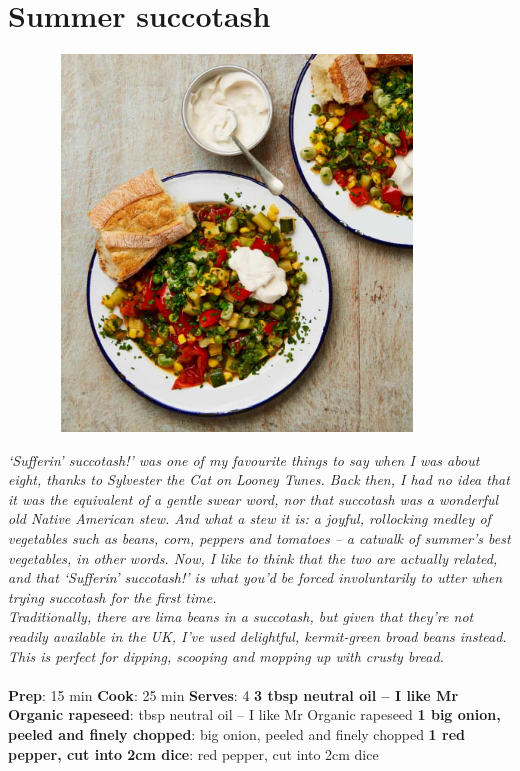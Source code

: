 \documentclass{book}
\begin{document}
\section{Summer succotash}
\begin{figure}
\centering\includegraphics[width=10cm,height=10cm,keepaspectratio]{Recipe_Pictures/Summer_succotash.png}
\end{figure}
\emph{‘Sufferin’ succotash!’ was one of my favourite things to say when I was about eight, thanks to Sylvester the Cat on Looney Tunes. Back then, I had no idea that it was the equivalent of a gentle swear word, nor that succotash was a wonderful old Native American stew. And what a stew it is: a joyful, rollocking medley of vegetables such as beans, corn, peppers and tomatoes – a catwalk of summer’s best vegetables, in other words. Now, I like to think that the two are actually related, and that ‘Sufferin’ succotash!’ is what you’d be forced involuntarily to utter when trying succotash for the first time.\\ 
Traditionally, there are lima beans in a succotash, but given that they’re not readily available in the UK, I’ve used delightful, kermit-green broad beans instead. This is perfect for dipping, scooping and mopping up with crusty bread.}\\\\ 
\textbf{Prep}: 15 min
\textbf{Cook}: 25 min
\textbf{Serves}: 4
\textbf{3 tbsp neutral oil – I like Mr Organic rapeseed}:  tbsp neutral oil – I like Mr Organic rapeseed
\textbf{1 big onion, peeled and finely chopped}:  big onion, peeled and finely chopped
\textbf{1 red pepper, cut into 2cm dice}:  red pepper, cut into 2cm dice
\end{document}
